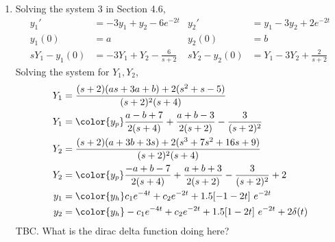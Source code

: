 \begin{enumerate}
\begin{enumerate}
              \item Solving the system $ 3 $ in Section 4.6,
                    \begin{align}
                        y_1'          & = -3y_1 + y_2 - 6e^{-2t}     &
                        y_2'          & = y_1 - 3y_2 + 2e^{-2t}        \\
                        y_1(0)        & = a                          &
                        y_2(0)        & = b                            \\
                        sY_1 - y_1(0) & = -3Y_1 + Y_2 -\frac{6}{s+2} &
                        sY_2 - y_2(0) & = Y_1 - 3Y_2 + \frac{2}{s+2}
                    \end{align}
                    Solving the system for $ Y_1, Y_2 $,
                    \begin{align}
                        Y_1 & = \frac{(s+2)(as + 3a + b) + 2(s^2 + s - 5)}
                        {(s+2)^2(s+4)}                                                  \\
                        Y_1 & = \color{y_p} \frac{a-b+7}{2(s+4)} + \frac{a+b-3}{2(s+2)}
                        - \frac{3}{(s+2)^2}                                             \\
                        Y_2 & = \frac{(s+2)(a + 3b + 3s) +
                        2(s^3 + 7s^2 + 16s + 9)}{(s+2)^2(s+4)}                          \\
                        Y_2 & = \color{y_p} \frac{-a + b - 7}{2(s+4)}
                        + \frac{a+b+3}{2(s+2)} - \frac{3}{(s+2)^2} + 2                  \\
                        y_1 & = \color{y_h} c_1 e^{-4t} + c_2 e^{-2t}
                        + 1.5[-1 - 2t]\ e^{-2t}                                         \\
                        y_2 & = \color{y_h} -c_1 e^{-4t} + c_2 e^{-2t}
                        + 1.5[1 - 2t]\ e^{-2t} + 2\delta(t)
                    \end{align}
                    TBC. What is the dirac delta function doing here?
          \end{enumerate}


\end{enumerate}

